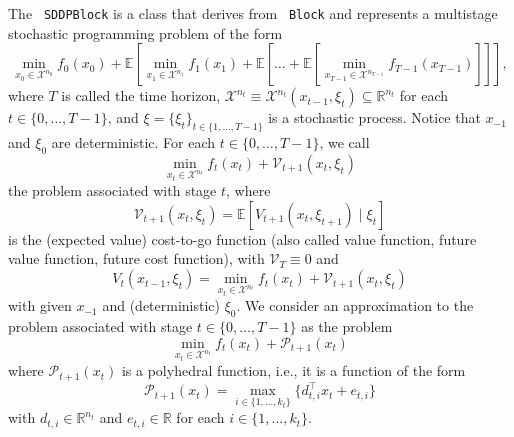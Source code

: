 \documentclass[a4paper]{article}
\newcommand{\code}[1]{\textrm{\texttt{\hyphenchar\font=200 #1}}}
\def\Block{\code{Block}\xspace}
\begin{document}
The \code{SDDPBlock} is a class that derives from \Block and represents a
multistage stochastic programming problem of the form
\[
   \min_{x_0 \in \mathcal{X}^{n_0}} f_0(x_0) +
   \mathbb{E} \left \lbrack
   \min_{x_1 \in \mathcal{X}^{n_1}} f_1(x_1) +
   \mathbb{E} \left \lbrack \dots +
   \mathbb{E} \left \lbrack
   \min_{x_{T-1} \in \mathcal{X}^{n_{T-1}}} f_{T-1}(x_{T-1})
   \right\rbrack \right\rbrack\right\rbrack,
\]
where $ T $ is called the time horizon, $\mathcal{X}^{n_t} \equiv
\mathcal{X}^{n_t}(x_{t-1}, \xi_t) \subseteq \mathbb{R}^{n_t}$ for each $t \in
\{0, \dots, T-1\}$, and $ \xi = \{ \xi_t \}_{t \in \{1, \dots, T-1\}} $ is a
stochastic process. Notice that $ x_{-1} $ and $ \xi_0 $ are
deterministic. For each $ t \in \{0, \dots, T-1\}$, we call
\[
   \min_{x_t \in \mathcal{X}^{n_t}} f_t(x_t) +
   \mathcal{V}_{t+1}(x_t, \xi_t)
\]
the problem associated with stage $ t $, where
\[
   \mathcal{V}_{t+1}(x_t, \xi_t) =
     \mathbb{E}
       \left\lbrack
         V_{t+1}(x_t, \xi_{t+1}) \mid \xi_t
       \right\rbrack
\]
is the (expected value) cost-to-go function (also called value
function, future value function, future cost function), with $
\mathcal{V}_{T} \equiv 0 $ and
\[
   V_{t}(x_{t-1}, \xi_{t}) =
   \min_{x_t \in \mathcal{X}^{n_t}} f_t(x_t) +
   \mathcal{V}_{t+1}(x_t, \xi_t)
\]
with given $ x_{-1} $ and (deterministic) $ \xi_0$. We consider an
approximation to the problem associated with stage $ t \in \{0, \dots, T-1\} $
as the problem
\begin{equation}
   \min_{x_t \in \mathcal{X}^{n_t}} f_t(x_t) +
   \mathcal{P}_{t+1}(x_t)
   \label{eq:approx_prob_sddp}
\end{equation}
where $ \mathcal{P}_{t+1}(x_t) $ is a polyhedral
function, i.e., it is a function of the form
\[
   \mathcal{P}_{t+1}(x_t) = \max_{i \in \{1,\dots,k_t\}}
                                    \{ d_{t,i}^{\top}x_t + e_{t,i} \}
\]
with $ d_{t,i} \in \mathbb{R}^{n_t} $ and $ e_{t,i} \in
\mathbb{R} $ for each $ i \in \{1,\dots,k_t\} $.
\end{document}
